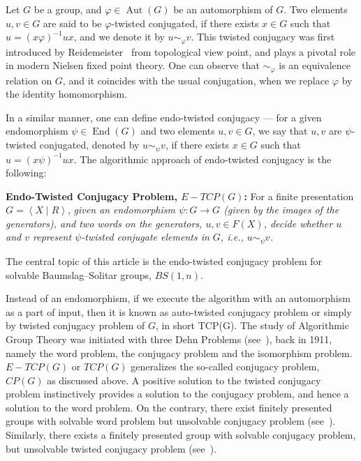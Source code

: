 \documentclass[a4paper]{amsart}
\theoremstyle{definition}
\newcommand{\Aut}{\operatorname{Aut}}
\newcommand{\End}{\operatorname{End}}
\newcommand{\pres}[2]{\left\langle#1 \mid #2\right\rangle}
\begin{document}
Let $G$ be a group, and $\varphi\in \Aut(G)$ be an automorphism of $G$. Two elements $u, v \in G$ are said to be $\varphi$-twisted conjugated, if there exists $x \in G$ such that $u = (x\varphi)^{-1} u x $, and we denote it by $u \sim_\varphi v$. This twisted conjugacy was first introduced by Reidemeister~\cite{R} from topological view point, and plays a pivotal role in modern Nielsen fixed point theory. One can observe that $\sim_\varphi$ is an equivalence relation on $G$, and it coincides with the usual conjugation, when we replace $\varphi$ by the identity homomorphism.

In a similar manner, one can define endo-twisted conjugacy --- for a given endomorphism $\psi \in \End(G)$ and two elements $u, v \in G$, we say that $u, v$ are $\psi$-twisted conjugated, denoted by $u \sim_\psi v$, if there exists $x \in G$ such that $u = (x\psi)^{-1} u x $. The algorithmic approach of endo-twisted conjugacy is the following:


\noindent \textbf{\boldmath Endo-Twisted Conjugacy Problem, $E-TCP(G)$:} For a finite presentation $G=\pres{X}{R}$, \emph{given an endomorphism $\psi\colon G\to G$ (given by the images of the generators), and two words on the generators, $u,v\in F(X)$, decide whether $u$ and $v$ represent $\psi$-twisted conjugate elements in $G$, i.e., $u\sim_{\psi} v$.}

The central topic of this article is the endo-twisted conjugacy problem for solvable Baumslag--Solitar groups, $BS(1,n)$.

Instead of an endomorphism, if we execute the algorithm with an automorphism as a part of input, then it is known as auto-twisted conjugacy problem or simply by twisted conjugacy problem of $G$, in short TCP(G). The study of Algorithmic Group Theory was initiated with three Dehn Problems (see~\cite{Dehn}), back in 1911, namely the word problem, the conjugacy problem and the isomorphism problem. $E-TCP(G)$ or $TCP(G)$ generalizes the so-called conjugacy problem, $CP(G)$ as discussed above. A positive solution to the twisted conjugacy problem instinctively provides a solution to the conjugacy problem, and hence a solution to the word problem. On the contrary, there exist finitely presented groups with solvable word problem but unsolvable conjugacy problem (see~\cite{M}). Similarly, there exists a finitely presented group with solvable conjugacy problem, but unsolvable twisted conjugacy problem (see~\cite[Corollary 4.9]{BMV}).
\end{document}

